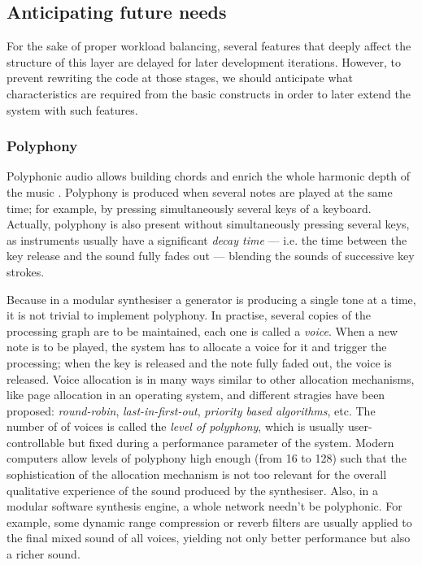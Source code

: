 \subsection{Anticipating future needs}

For the sake of proper workload balancing, several features that
deeply affect the structure of this layer are delayed for later
development iterations. However, to prevent rewriting the code at
those stages, we should anticipate what characteristics are
required from the basic constructs in order to later extend the system
with such features.

\subsubsection{Polyphony}

Polyphonic audio allows building chords and enrich
the whole harmonic depth of the music
\cite{johnson02measured}. Polyphony is produced when several notes are
played at the same time; for example, by pressing simultaneously
several keys of a keyboard. Actually, polyphony is also present
without simultaneously pressing several keys, as instruments usually
have a significant \emph{decay time} --- i.e. the
time between the key release and the sound fully fades out ---
blending the sounds of successive key strokes.

Because in a modular synthesiser a generator is producing a single
tone at a time, it is not trivial to implement polyphony. In practise,
several copies of the processing graph are to be maintained, each one
is called a \emph{voice}. When a new note is
to be played, the system has to allocate a voice for it and trigger
the processing; when the key is released and the note fully faded out,
the voice is released. Voice allocation is in many ways similar to
other allocation mechanisms, like page allocation in an operating
system, and different stragies have been proposed: \emph{round-robin},
\emph{last-in-first-out}, \emph{priority based algorithms}, etc. The
number of of voices is called the \emph{level of polyphony}, which is
usually user-controllable but fixed during a performance parameter of
the system. Modern computers allow levels of polyphony
high enough (from 16 to 128) such that the sophistication of the
allocation mechanism is not too relevant for the overall qualitative
experience of the sound produced by the synthesiser. Also, in a
modular software synthesis engine, a whole network needn't be
polyphonic. For example, some dynamic range compression or reverb
filters are usually applied to the final mixed sound of all voices,
yielding not only better performance but also a richer sound.

